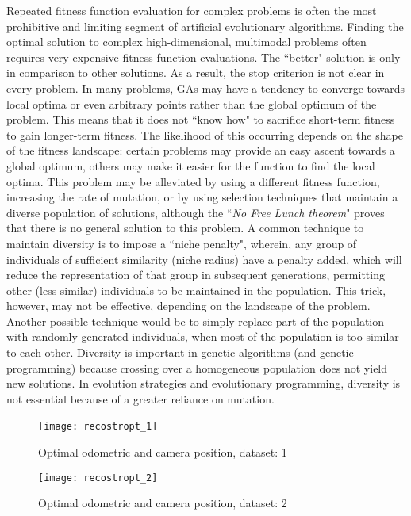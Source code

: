 Repeated fitness function evaluation for complex problems is often the most prohibitive and limiting segment of artificial evolutionary algorithms. Finding the optimal solution to complex high-dimensional, multimodal problems often requires very expensive fitness function evaluations.
The ``better" solution is only in comparison to other solutions. As a result, the stop criterion is not clear in every problem.
In many problems, GAs may have a tendency to converge towards local optima or even arbitrary points rather than the global optimum of the problem. This means that it does not ``know how" to sacrifice short-term fitness to gain longer-term fitness. The likelihood of this occurring depends on the shape of the fitness landscape: certain problems may provide an easy ascent towards a global optimum, others may make it easier for the function to find the local optima. 
This problem may be alleviated by using a different fitness function, increasing the rate of mutation, or by using selection techniques that maintain a diverse population of solutions, although the ``\emph{No Free Lunch theorem}" proves that there is no general solution to this problem. 
A common technique to maintain diversity is to impose a ``niche penalty", wherein, any group of individuals of sufficient similarity (niche radius) have a penalty added, which will reduce the representation of that group in subsequent generations, permitting other (less similar) individuals to be maintained in the population. This trick, however, may not be effective, depending on the landscape of the problem. 
Another possible technique would be to simply replace part of the population with randomly generated individuals, when most of the population is too similar to each other. Diversity is important in genetic algorithms (and genetic programming) because crossing over a homogeneous population does not yield new solutions. 
In evolution strategies and evolutionary programming, diversity is not essential because of a greater reliance on mutation.\columnbreak
\begin{figure}[!h]
   {\texttt{[image: recostropt\_1]}}\,
   \caption{Optimal odometric and camera position, dataset: 1}
   \label{fig:OptiOdo1}
\end{figure}
\begin{figure}[!h]
   {\texttt{[image: recostropt\_2]}}\\
   \caption{Optimal odometric and camera position, dataset: 2}
   \label{fig:OptiOdo2}
\end{figure}
